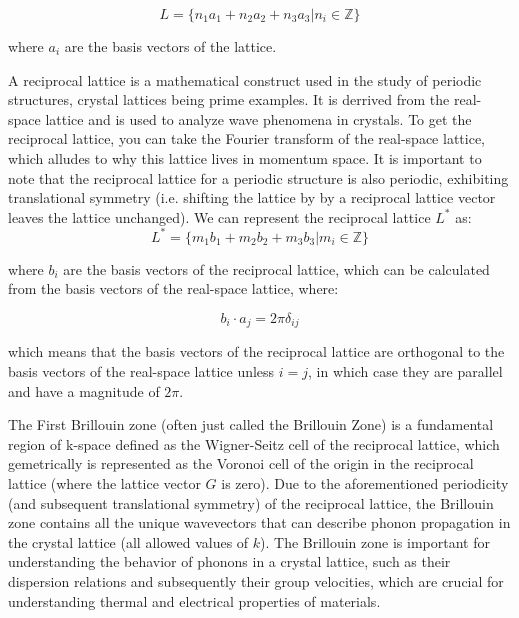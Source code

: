\documentclass{article}
\begin{document}
\begin{equation}
L = \{ n_1 a_1 + n_2 a_2 + n_3 a_3 | n_i \in \mathbb{Z} \}
\end{equation}

where $a_i$ are the basis vectors of the lattice.

A reciprocal lattice is a mathematical construct used in the study of periodic structures, crystal lattices being prime examples. It is derrived from the real-space lattice and is used to analyze wave phenomena in crystals. To get the reciprocal lattice, you can take the Fourier transform of the real-space lattice, which alludes to why this lattice lives in momentum space. It is important to note that the reciprocal lattice for a periodic structure is also periodic, exhibiting translational symmetry (i.e. shifting the lattice by by a reciprocal lattice vector leaves the lattice unchanged). We can represent the reciprocal lattice $L^*$ as:
\begin{equation}
L^* = \{ m_1 b_1 + m_2 b_2 + m_3 b_3 | m_i \in \mathbb{Z} \}
\end{equation}

where $b_i$ are the basis vectors of the reciprocal lattice, which can be calculated from the basis vectors of the real-space lattice, where:

\begin{equation}
b_i \cdot  a_j = 2\pi \delta_{ij}
\end{equation}

which means that the basis vectors of the reciprocal lattice are orthogonal to the basis vectors of the real-space lattice unless $i = j$, in which case they are parallel and have a magnitude of $2\pi$.

The First Brillouin zone (often just called the Brillouin Zone) is a fundamental region of k-space defined as the Wigner-Seitz cell of the reciprocal lattice, which gemetrically is represented as the Voronoi cell of the origin in the reciprocal lattice (where the lattice vector $G$ is zero). Due to the aforementioned periodicity (and subsequent translational symmetry) of the reciprocal lattice, the Brillouin zone contains all the unique wavevectors that can describe phonon propagation in the crystal lattice (all allowed values of $k$). The Brillouin zone is important for understanding the behavior of phonons in a crystal lattice, such as their dispersion relations and subsequently their group velocities, which are crucial for understanding thermal and electrical properties of materials.
\end{document}
